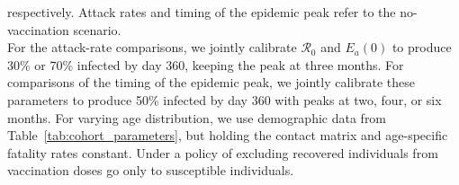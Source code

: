 \documentclass[12pt]{article}
\newcommand{\Rzero}{\mathcal{R}_0}
\begin{document}
\begin{table}[htbp]
{respectively. Attack rates and timing of the epidemic peak refer to the
no-vaccination scenario.\\
For the attack-rate comparisons, we jointly calibrate $\Rzero$ and
$E_a(0)$ to produce 30\% or 70\% infected by day 360, keeping the peak
at three months. For comparisons of the timing of the epidemic peak,
we jointly calibrate these parameters to produce 50\% infected by day
360 with peaks at two, four, or six months. For varying age distribution, 
we use demographic data from Table~\ref{tab:cohort_parameters}, but 
holding the contact matrix and age-specific fatality rates constant.
Under a policy of excluding recovered individuals from vaccination 
doses go only to susceptible individuals.}
\end{table}



\clearpage
\end{document}
